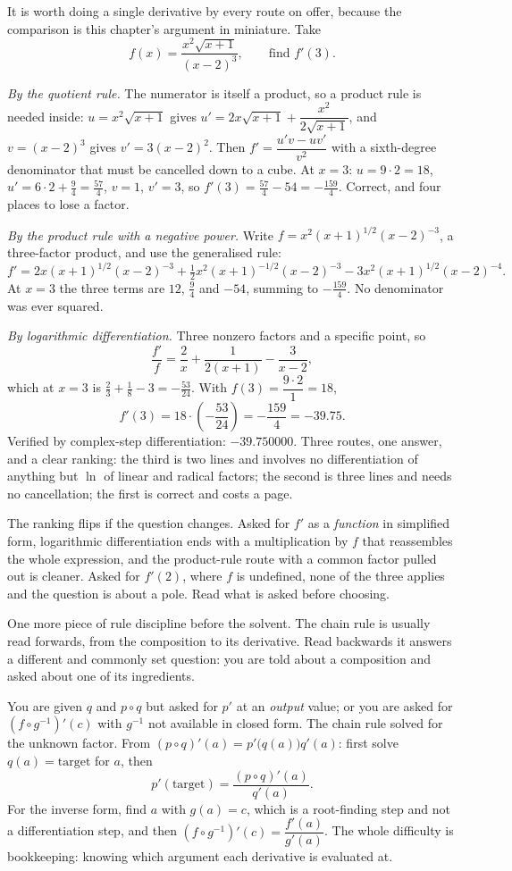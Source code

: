 It is worth doing a single derivative by every route on offer, because the comparison is this chapter's argument in miniature. Take
\[
f(x)=\frac{x^{2}\sqrt{x+1}}{(x-2)^{3}},\qquad\text{find } f'(3).
\]

\emph{By the quotient rule.} The numerator is itself a product, so a product rule is needed inside: $u=x^{2}\sqrt{x+1}$ gives $u'=2x\sqrt{x+1}+\dfrac{x^{2}}{2\sqrt{x+1}}$, and $v=(x-2)^{3}$ gives $v'=3(x-2)^{2}$. Then $f'=\dfrac{u'v-uv'}{v^{2}}$ with a sixth-degree denominator that must be cancelled down to a cube. At $x=3$: $u=9\cdot2=18$, $u'=6\cdot2+\tfrac94=\tfrac{57}{4}$, $v=1$, $v'=3$, so $f'(3)=\tfrac{57}{4}-54=-\tfrac{159}{4}$. Correct, and four places to lose a factor.

\emph{By the product rule with a negative power.} Write $f=x^{2}(x+1)^{1/2}(x-2)^{-3}$, a three-factor product, and use the generalised rule:
\[
f'=2x(x+1)^{1/2}(x-2)^{-3}+\tfrac12x^{2}(x+1)^{-1/2}(x-2)^{-3}-3x^{2}(x+1)^{1/2}(x-2)^{-4}.
\]
At $x=3$ the three terms are $12$, $\tfrac94$ and $-54$, summing to $-\tfrac{159}{4}$. No denominator was ever squared.

\emph{By logarithmic differentiation.} Three nonzero factors and a specific point, so
\[
\frac{f'}{f}=\frac{2}{x}+\frac{1}{2(x+1)}-\frac{3}{x-2},
\]
which at $x=3$ is $\tfrac23+\tfrac18-3=-\tfrac{53}{24}$. With $f(3)=\dfrac{9\cdot2}{1}=18$,
\[
f'(3)=18\cdot\left(-\frac{53}{24}\right)=-\frac{159}{4}=-39.75 .
\]
Verified by complex-step differentiation: $-39.750000$. Three routes, one answer, and a clear ranking: the third is two lines and involves no differentiation of anything but $\ln$ of linear and radical factors; the second is three lines and needs no cancellation; the first is correct and costs a page.

The ranking flips if the question changes. Asked for $f'$ as a \emph{function} in simplified form, logarithmic differentiation ends with a multiplication by $f$ that reassembles the whole expression, and the product-rule route with a common factor pulled out is cleaner. Asked for $f'(2)$, where $f$ is undefined, none of the three applies and the question is about a pole. Read what is asked before choosing.

One more piece of rule discipline before the solvent. The chain rule is usually read forwards, from the composition to its derivative. Read backwards it answers a different and commonly set question: you are told about a composition and asked about one of its ingredients.

\cue You are given $q$ and $p\circ q$ but asked for $p'$ at an \emph{output} value; or you are asked for $(f\circ g^{-1})'(c)$ with $g^{-1}$ not available in closed form.
\method The chain rule solved for the unknown factor. From $(p\circ q)'(a)=p'\bigl(q(a)\bigr)q'(a)$: first solve $q(a)=\text{target}$ for $a$, then
\[
p'(\text{target})=\frac{(p\circ q)'(a)}{q'(a)}.
\]
For the inverse form, find $a$ with $g(a)=c$, which is a root-finding step and not a differentiation step, and then $(f\circ g^{-1})'(c)=\dfrac{f'(a)}{g'(a)}$. The whole difficulty is bookkeeping: knowing which argument each derivative is evaluated at.

